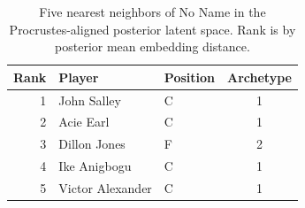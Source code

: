 \begin{table}[htbp]
  \centering\small
  \begin{tabular}{rllc}
    \toprule
    Rank & Player & Position & Archetype \\
    \midrule
    1 & John Salley & C & 1 \\
    2 & Acie Earl & C & 1 \\
    3 & Dillon Jones & F & 2 \\
    4 & Ike Anigbogu & C & 1 \\
    5 & Victor Alexander & C & 1 \\
    \bottomrule
  \end{tabular}
  \caption{Five nearest neighbors of No Name in the Procrustes-aligned posterior latent space. Rank is by posterior mean embedding distance.}
  \label{tab:No_Name_neighbors}
\end{table}

